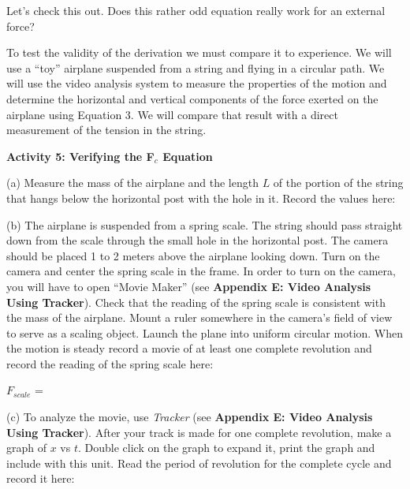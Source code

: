 Let's check this out. Does this rather odd equation really work for an external
force?

To test the validity of the derivation we must compare it to experience. We
will use a ``toy'' airplane suspended from a string and flying
in a circular path. We will use the video analysis system to measure the properties
of the motion and determine the horizontal and vertical components of the force
exerted on the airplane using Equation 3. We will compare that result with a
direct measurement of the tension in the string. 

\textbf{Activity 5: Verifying the F\( _{c} \) Equation }

(a) Measure the mass of the airplane and the length $L$ of the portion of the
string that hangs below the horizontal post with the hole in it. Record the
values here: 
\vspace{10mm}

(b) The airplane is suspended from a spring scale. The string should pass straight
down from the scale through the small hole in the horizontal post. The camera
should be placed 1 to 2 meters above the airplane looking down. Turn on the camera and center
the spring scale in the frame. In order to turn on the camera, you will have to open ``Movie Maker'' (see \textbf{Appendix E: Video Analysis Using Tracker}). Check that the reading of the spring
scale is consistent with the mass of the airplane. Mount a ruler somewhere in the
camera's field of view to serve as a scaling object. Launch the plane into uniform
circular motion. When the motion is steady record a movie of at least one complete
revolution and record the reading of the spring scale here:
\vspace{5mm}

\hspace{0.5in} \( F_{scale} \) = 
\vspace{5mm}

%
%
(c) To analyze the movie, use \textit{Tracker} (see \textbf{Appendix E: Video Analysis Using Tracker}). After your track is made for one complete revolution, make a graph of $x$ vs $t$. Double click on the graph to expand it, print the graph and include with this unit. Read the period of revolution for the complete cycle and record it here:
\vspace{5mm}

